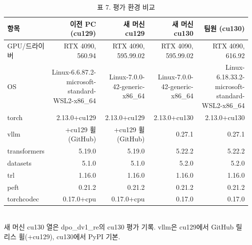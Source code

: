 \begin{table}[t]
\centering
\small
\caption{표 7. 평가 환경 비교}
\label{tab:table7_environments}
\begin{tabular}{lrrrr}
\toprule
항목 & 이전 PC (cu129) & 새 머신 cu129 & 새 머신 cu130 & 팀원 (cu130) \\
\midrule
GPU/드라이버 & RTX 4090, 560.94 & RTX 4090, 595.99.02 & RTX 4090, 595.99.02 & RTX 4090, 616.92 \\
OS & Linux-6.6.87.2-microsoft-standard-WSL2-x86\_64 & Linux-7.0.0-42-generic-x86\_64 & Linux-7.0.0-42-generic-x86\_64 & Linux-6.18.33.2-microsoft-standard-WSL2-x86\_64 \\
torch & 2.13.0+cu129 & 2.13.0+cu129 & 2.13.0+cu130 & 2.13.0+cu130 \\
vllm & +cu129 휠(GitHub) & +cu129 휠(GitHub) & 0.27.1 & 0.27.1 \\
transformers & 5.19.0 & 5.19.0 & 5.22.2 & 5.22.2 \\
datasets & 5.1.0 & 5.1.0 & 5.2.0 & 5.2.0 \\
trl & 1.16.0 & 1.16.0 & 1.16.0 & 1.16.0 \\
peft & 0.21.2 & 0.21.2 & 0.21.2 & 0.21.2 \\
torchcodec & 0.17.0+cpu & 0.17.0+cpu & 0.17.0 & 0.17.0 \\
\bottomrule
\end{tabular}
\\[2pt]{\footnotesize 새 머신 cu130 열은 dpo\_dv1\_re의 cu130 평가 기록. vllm은 cu129에서 GitHub 릴리스 휠(+cu129), cu130에서 PyPI 기본.}
\end{table}
